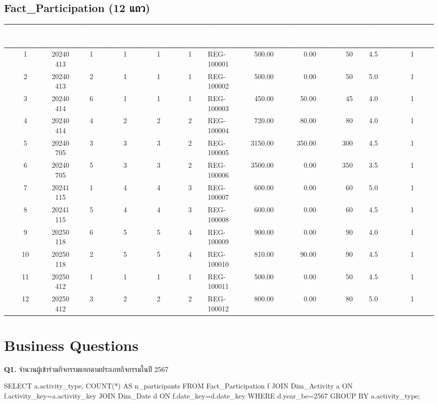 \documentclass[11pt]{article}
\begin{document}
\subsection*{Fact_Participation (12 แถว)}
\begin{adjustbox}{max width=\linewidth}
\begin{tabular}{@{}c c c c c c l r r r c c@{}}
\toprule
\rowcolor{tblHead}
\textcolor{white}{participation_key} & \textcolor{white}{date_key} & \textcolor{white}{member_key} & \textcolor{white}{activity_key} & \textcolor{white}{location_key} & \textcolor{white}{team_key} & \textcolor{white}{registration_id} & \textcolor{white}{amount_paid} & \textcolor{white}{discount_amount} & \textcolor{white}{points_earned} & \textcolor{white}{review_score} & \textcolor{white}{participant_count}\\
\midrule
1 & 20240413 & 1 & 1 & 1 & 1 & REG-100001 & 500.00 & 0.00 & 50 & 4.5 & 1\\
2 & 20240413 & 2 & 1 & 1 & 1 & REG-100002 & 500.00 & 0.00 & 50 & 5.0 & 1\\
3 & 20240414 & 6 & 1 & 1 & 1 & REG-100003 & 450.00 & 50.00 & 45 & 4.0 & 1\\
4 & 20240414 & 4 & 2 & 2 & 2 & REG-100004 & 720.00 & 80.00 & 80 & 4.0 & 1\\
5 & 20240705 & 3 & 3 & 3 & 2 & REG-100005 & 3150.00 & 350.00 & 300 & 4.5 & 1\\
6 & 20240705 & 5 & 3 & 3 & 2 & REG-100006 & 3500.00 & 0.00 & 350 & 3.5 & 1\\
7 & 20241115 & 1 & 4 & 4 & 3 & REG-100007 & 600.00 & 0.00 & 60 & 5.0 & 1\\
8 & 20241115 & 5 & 4 & 4 & 3 & REG-100008 & 600.00 & 0.00 & 60 & 4.5 & 1\\
9 & 20250118 & 6 & 5 & 5 & 4 & REG-100009 & 900.00 & 0.00 & 90 & 4.0 & 1\\
10 & 20250118 & 2 & 5 & 5 & 4 & REG-100010 & 810.00 & 90.00 & 90 & 4.5 & 1\\
11 & 20250412 & 1 & 1 & 1 & 1 & REG-100011 & 500.00 & 0.00 & 50 & 4.5 & 1\\
12 & 20250412 & 3 & 2 & 2 & 2 & REG-100012 & 800.00 & 0.00 & 80 & 5.0 & 1\\
\bottomrule
\end{tabular}
\end{adjustbox}
\normalsize
\clearpage
\section{Business Questions}
\textbf{Q1.} จำนวนผู้เข้าร่วมกิจกรรมแยกตามประเภทกิจกรรมในปี 2567
\begin{sql}
SELECT a.activity_type, COUNT(*) AS n_participants
FROM Fact_Participation f
JOIN Dim_Activity a ON f.activity_key=a.activity_key
JOIN Dim_Date d ON f.date_key=d.date_key
WHERE d.year_be=2567
GROUP BY a.activity_type;
\end{sql}
\end{document}
